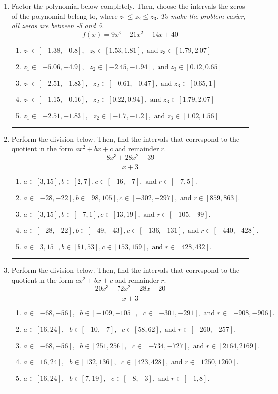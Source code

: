 \documentclass[14pt]{extbook}
\newcommand{\litem}[1]{\item#1\hspace*{-1cm}\rule{\textwidth}{0.4pt}}
\begin{document}
\begin{enumerate}
\litem{
Factor the polynomial below completely. Then, choose the intervals the zeros of the polynomial belong to, where $z_1 \leq z_2 \leq z_3$. \textit{To make the problem easier, all zeros are between -5 and 5.}\[ f(x) = 9x^{3} -21 x^{2} -14 x + 40 \]\begin{enumerate}[label=\Alph*.]
\item \( z_1 \in [-1.38, -0.8], \text{   }  z_2 \in [1.53, 1.81], \text{   and   } z_3 \in [1.79, 2.07] \)
\item \( z_1 \in [-5.06, -4.9], \text{   }  z_2 \in [-2.45, -1.94], \text{   and   } z_3 \in [0.12, 0.65] \)
\item \( z_1 \in [-2.51, -1.83], \text{   }  z_2 \in [-0.61, -0.47], \text{   and   } z_3 \in [0.65, 1] \)
\item \( z_1 \in [-1.15, -0.16], \text{   }  z_2 \in [0.22, 0.94], \text{   and   } z_3 \in [1.79, 2.07] \)
\item \( z_1 \in [-2.51, -1.83], \text{   }  z_2 \in [-1.7, -1.2], \text{   and   } z_3 \in [1.02, 1.56] \)

\end{enumerate} }
\litem{
Perform the division below. Then, find the intervals that correspond to the quotient in the form $ax^2+bx+c$ and remainder $r$.\[ \frac{8x^{3} +28 x^{2} -39}{x + 3} \]\begin{enumerate}[label=\Alph*.]
\item \( a \in [3, 15], b \in [2, 7], c \in [-16, -7], \text{ and } r \in [-7, 5]. \)
\item \( a \in [-28, -22], b \in [98, 105], c \in [-302, -297], \text{ and } r \in [859, 863]. \)
\item \( a \in [3, 15], b \in [-7, 1], c \in [13, 19], \text{ and } r \in [-105, -99]. \)
\item \( a \in [-28, -22], b \in [-49, -43], c \in [-136, -131], \text{ and } r \in [-440, -428]. \)
\item \( a \in [3, 15], b \in [51, 53], c \in [153, 159], \text{ and } r \in [428, 432]. \)

\end{enumerate} }
\litem{
Perform the division below. Then, find the intervals that correspond to the quotient in the form $ax^2+bx+c$ and remainder $r$.\[ \frac{20x^{3} +72 x^{2} +28 x -20}{x + 3} \]\begin{enumerate}[label=\Alph*.]
\item \( a \in [-68, -56], \text{   } b \in [-109, -105], \text{   } c \in [-301, -291], \text{   and   } r \in [-908, -906]. \)
\item \( a \in [16, 24], \text{   } b \in [-10, -7], \text{   } c \in [58, 62], \text{   and   } r \in [-260, -257]. \)
\item \( a \in [-68, -56], \text{   } b \in [251, 256], \text{   } c \in [-734, -727], \text{   and   } r \in [2164, 2169]. \)
\item \( a \in [16, 24], \text{   } b \in [132, 136], \text{   } c \in [423, 428], \text{   and   } r \in [1250, 1260]. \)
\item \( a \in [16, 24], \text{   } b \in [7, 19], \text{   } c \in [-8, -3], \text{   and   } r \in [-1, 8]. \)


\end{enumerate}}
\end{enumerate}
\end{document}
